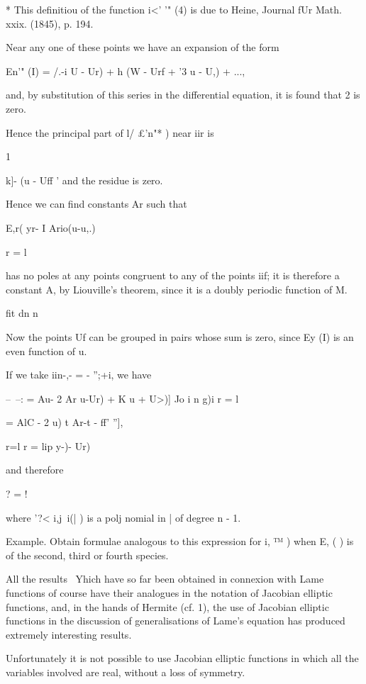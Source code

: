 {{{{{{{* This definitiou of the function i<' '" (4) is due to Heine, Journal
fUr Math. xxix. (1845), p. 194.

%
%

Near any one of these points we have an expansion of the form

En'" (I) = /.-i U - Ur) + h (W - Urf + '3 u - U,) + ...,

and, by substitution of this series in the differential equation, it
is found that 2 is zero.

Hence the principal part of l/ £'n"* ) near iir is

1

k]- (u - Uff ' and the residue is zero.

Hence we can find constants Ar such that

 E,r( yr- I Ario(u-u,.)

r = l

has no poles at any points congruent to any of the points iif; it is
therefore a constant A, by Liouville's theorem, since it is a doubly
periodic function of M.

fit dn n

Now the points Uf can be grouped in pairs whose sum is zero, since Ey
(I) is an even function of u.

If we take iin-,- = - '';+i, we have

--~--: = Au- 2 Ar u-Ur) + K u + U>)] Jo i n g)i r = l

= AlC - 2 u) t Ar-t - ff' ''],

r=l r = lip y-)- Ur)

and therefore

? = !

where '?< i,j\ i(| ) is a polj nomial in | of degree n - 1.

Example. Obtain formulae analogous to this expression for i, ™ ) when
E, ( ) is of the second, third or fourth species.


All the results \ Yhich have so far been obtained in connexion with
Lame functions of course have their analogues in the notation of
Jacobian elliptic functions, and, in the hands of Hermite (cf.
1), the use of Jacobian elliptic functions in the discussion of
generalisations of Lame's equation has produced extremely interesting
results.

Unfortunately it is not possible to use Jacobian elliptic functions in
which all the variables involved are real, without a loss of symmetry.

}}}}}}}
